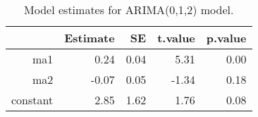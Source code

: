 \begin{table}[ht]
\centering
\begin{tabular}{rrrrr}
  \hline
 & Estimate & SE & t.value & p.value \\ 
  \hline
ma1 & 0.24 & 0.04 & 5.31 & 0.00 \\ 
  ma2 & -0.07 & 0.05 & -1.34 & 0.18 \\ 
  constant & 2.85 & 1.62 & 1.76 & 0.08 \\ 
   \hline
\end{tabular}
\caption{Model estimates for ARIMA(0,1,2) model.}
\end{table}